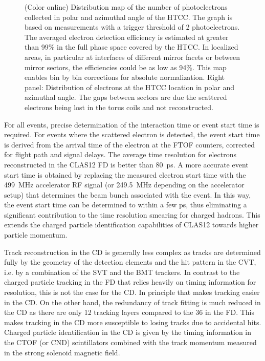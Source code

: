 \documentclass[final,3p,twocolumn]{elsarticle}
\begin{document}
\begin{figure}[t!]
\caption{(Color online) Distribution map of the number of photoelectrons collected in polar and azimuthal angle of the HTCC. 
The graph is based on measurements with a trigger threshold of 2 photoelectrons.
The averaged electron detection efficiency is estimated at greater than 99\% in the full phase space covered by the HTCC. 
In localized areas, in particular at interfaces of different mirror facets or between mirror sectors, the efficiencies could be as low as 
94\%. This map enables bin by bin corrections for absolute normalization. Right panel: Distribution of electrons at the HTCC 
location in polar and azimuthal angle. The gaps between sectors are
  due the scattered electrons being lost in the torus coils and not reconstructed. }
\label{htcc-performance} 
\end{figure}

For all events, precise determination of the interaction time or event start time is required. For events where the
scattered electron is detected, the event start time is derived from the arrival time of the electron at the FTOF
counters, corrected for flight path and signal delays.  The average time resolution for electrons reconstructed in
the CLAS12 FD is better than 80~ps. A more accurate event start time is obtained by replacing the measured
electron start time with the 499~MHz accelerator RF signal (or 249.5~MHz depending on the accelerator setup)
that determines the beam bunch associated with the event. In this way, the event start time can be determined
to within a few ps, thus eliminating a significant contribution to the time resolution smearing for charged hadrons.
This extends the charged particle identification capabilities of CLAS12 towards higher particle momentum.

Track reconstruction in the CD is generally less complex as tracks are determined fully by the geometry of the 
detection elements and the hit pattern in the CVT, i.e. by a combination of the SVT and the BMT trackers.  In
contrast to the charged particle tracking in the FD that relies heavily on timing information for resolution, this
is not the case for the CD. In principle that makes tracking easier in the CD. On the other hand, the redundancy
of track fitting is much reduced in the CD as there are only 12 tracking layers compared to the 36 in the FD. This
makes tracking in the CD more susceptible to losing tracks due to accidental hits. Charged particle identification
in the CD is given by the timing information in the CTOF (or CND) scintillators combined with the track momentum
measured in the strong solenoid magnetic field.
\end{document}
